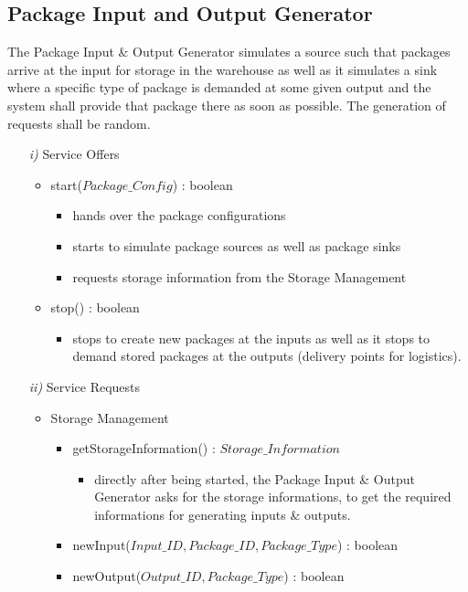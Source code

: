 \documentclass{article}
\begin{document}
\subsection{Package Input and Output Generator}
The Package Input \& Output Generator simulates a source such that packages arrive at the input for storage in the warehouse as well as it simulates a sink where a specific type of package is demanded at some given output and the system shall provide that package there as soon as possible. The generation of requests shall be random.
\begin{enumerate}
	\item[\textit{i)}] Service Offers
	\begin{itemize}
		\item start($Package\_Config$) : boolean
		\begin{itemize}
			\item hands over the package configurations
			\item starts to simulate package sources as well as package sinks
			\item requests storage information from the Storage Management
		\end{itemize}
		\item stop() : boolean
		\begin{itemize}
			\item stops to create new packages at the inputs as well as it stops to demand stored packages at the outputs (delivery points for logistics).
		\end{itemize}
	\end{itemize}
	\item[\textit{ii)}] Service Requests
	\begin{itemize}
		\item Storage Management
		\begin{itemize}
			\item getStorageInformation() : $Storage\_Information$
			\begin{itemize}
				\item directly after being started, the Package Input \& Output Generator asks for the storage informations, to get the required informations for generating inputs \& outputs.
			\end{itemize}
			\item newInput($Input\_ID, Package\_ID, Package\_Type$) : boolean
			\item newOutput($Output\_ID, Package\_Type$) : boolean
		\end{itemize}

\end{itemize}
\end{enumerate}
\end{document}
